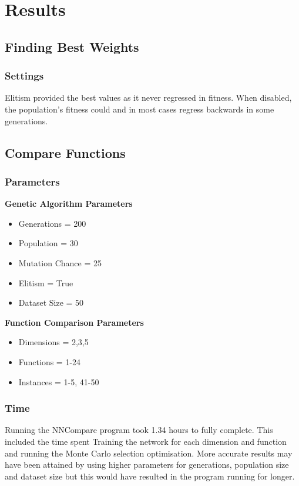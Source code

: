 \documentclass[12pt]{article}
\begin{document}
\newpage
\section{Results}
\subsection{Finding Best Weights}
\subsubsection{Settings}
Elitism provided the best values as it never regressed in fitness. When disabled, the population's fitness could and in most cases regress backwards in some generations.

\subsection{Compare Functions}
\subsubsection{Parameters}
\textbf{Genetic Algorithm Parameters}
\begin{itemize}
	\item Generations = 200
	\item Population = 30
	\item Mutation Chance = 25%
	\item Elitism = True
	\item Dataset Size = 50
\end{itemize}
\textbf{Function Comparison Parameters}
\begin{itemize}
	\item Dimensions = 2,3,5
	\item Functions = 1-24
	\item Instances = 1-5, 41-50
\end{itemize}

\subsubsection{Time}
Running the NNCompare program took 1.34 hours to fully complete. This included the time spent Training the network for each dimension and function and running the Monte Carlo selection optimisation. More accurate results may have been attained by using higher parameters for generations, population size and dataset size but this would have resulted in the program running for longer.
\end{document}
